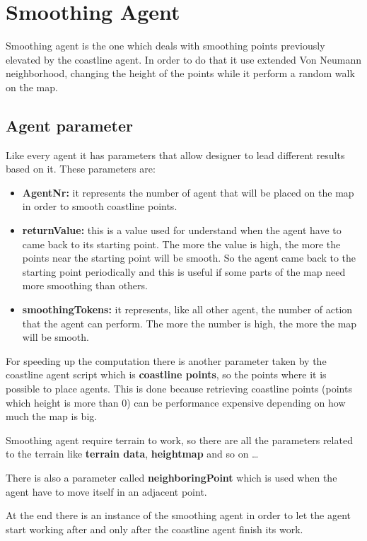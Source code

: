 \documentclass[12pt]{article}
\begin{document}
    \section{Smoothing Agent}
    Smoothing agent is the one which deals with smoothing points previously elevated by the coastline agent.
    In order to do that it use extended Von Neumann neighborhood, changing the height of the points while it perform a random walk 
    on the map.
    
    \subsection{Agent parameter}
    Like every agent it has parameters that allow designer to lead different results based on it.
    These parameters are:
    \begin{itemize}
        \item \textbf{AgentNr:} it represents the number of agent that will be placed on the map in order to smooth coastline points.
        \item \textbf{returnValue:} this is a value used for understand when the agent have to came back to its starting point. The more the value is high, the more
        the points near the starting point will be smooth. So the agent came back to the starting point periodically and this is useful if some parts of the map need 
        more smoothing than others.
        \item \textbf{smoothingTokens:} it represents, like all other agent, the number of action that the agent can perform. The more the number is high, the more the map will be smooth.
    \end{itemize}

    For speeding up the computation there is another parameter taken by the coastline agent script which is \textbf{coastline points}, so the points where it is possible to place agents.
    This is done because retrieving coastline points (points which height is more than 0) can be performance expensive depending on how much the map is big. 

    \noindent 
    Smoothing agent require terrain to work, so there are all the parameters related to the terrain like \textbf{terrain data}, \textbf{heightmap} and so on \dots

    \noindent
    There is also a parameter called \textbf{neighboringPoint} which is used when the agent have to move itself in an adjacent point.
    
    \noindent
    At the end there is an instance of the smoothing agent in order to let the agent start working after and only after the coastline agent finish its work.
\end{document}
